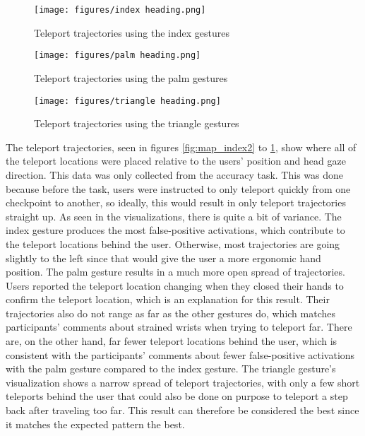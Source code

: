 \begin{figure}[!htb]
        \texttt{[image: figures/index heading.png]}
        \caption{Teleport trajectories using the index gestures}\label{fig:map_index2}
    \endminipage\hfill
        \texttt{[image: figures/palm heading.png]}
        \caption{Teleport trajectories using the palm gestures}\label{fig:map_palm2}
    \endminipage\hfill
        \texttt{[image: figures/triangle heading.png]}
        \caption{Teleport trajectories using the triangle gestures}\label{fig:map_triangle2}
    \endminipage
\end{figure}

The teleport trajectories, seen in figures \ref{fig:map_index2} to \ref{fig:map_triangle2}, show where all of the teleport locations were placed relative to the users' position and head gaze direction. This data was only collected from the accuracy task. This was done because before the task, users were instructed to only teleport quickly from one checkpoint to another, so ideally, this would result in only teleport trajectories straight up. As seen in the visualizations, there is quite a bit of variance. The index gesture produces the most false-positive activations, which contribute to the teleport locations behind the user. Otherwise, most trajectories are going slightly to the left since that would give the user a more ergonomic hand position. The palm gesture results in a much more open spread of trajectories. Users reported the teleport location changing when they closed their hands to confirm the teleport location, which is an explanation for this result. Their trajectories also do not range as far as the other gestures do, which matches participants' comments about strained wrists when trying to teleport far. There are, on the other hand, far fewer teleport locations behind the user, which is consistent with the participants' comments about fewer false-positive activations with the palm gesture compared to the index gesture. The triangle gesture's visualization shows a narrow spread of teleport trajectories, with only a few short teleports behind the user that could also be done on purpose to teleport a step back after traveling too far. This result can therefore be considered the best since it matches the expected pattern the best. 

